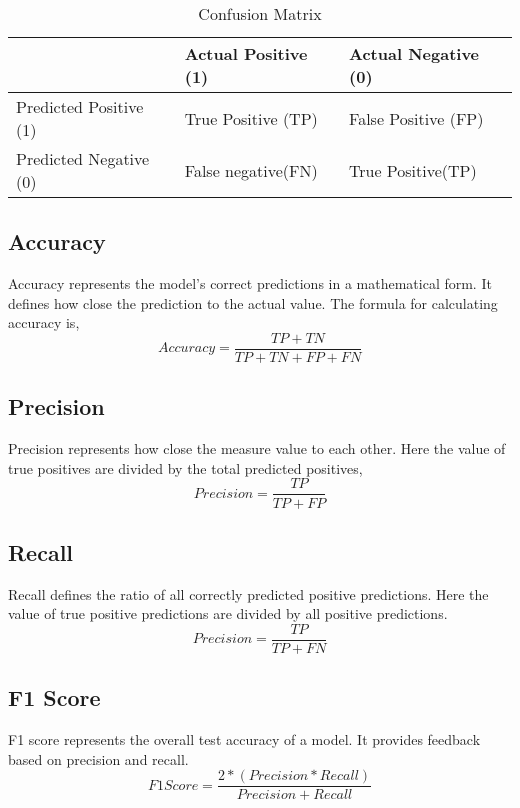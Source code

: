 \begin{table}[h!]
\centering
\begin{tabular}{|l|l|l|}
\hline
& Actual Positive (1) & Actual Negative (0)\\
\hline
Predicted Positive (1) & True Positive (TP) & False Positive (FP)  \\
\hline
Predicted Negative (0) & False negative(FN) & True Positive(TP) \\
\hline
\end{tabular}
\caption{Confusion Matrix}
\end{table}

\subsection{Accuracy}
Accuracy represents the model's correct predictions in a mathematical form. It defines how close the prediction to the actual value.
The formula for calculating accuracy is,
\begin{equation}
Accuracy = {\frac{TP+TN}{TP+TN+FP+FN}}
\end{equation}

\subsection{Precision}
Precision represents how close the measure value to each other. Here the value of true positives are divided by the total predicted positives,
\begin{equation}
Precision = {\frac{TP}{TP+FP}}
\end{equation}

\subsection{Recall}
Recall defines the ratio of all correctly predicted positive predictions. Here the value of true positive predictions are divided by all positive predictions.
\begin{equation}
Precision = {\frac{TP}{TP+FN}}
\end{equation}

\subsection{F1 Score}
F1 score represents the overall test accuracy of a model. It provides feedback based on precision and recall.
\begin{equation}
F1 Score = {\frac{2*(Precision*Recall)}{Precision+Recall}}
\end{equation}

